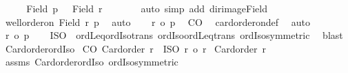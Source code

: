 \begin{isabellebody}
\ \ \isamarkupfalse%
\ \isamarkupfalse%
\ {\isachardoublequoteopen}Field\ {\isacharquery}{\kern0pt}p\ {\isacharequal}{\kern0pt}\ \ Field\ r{\isachardoublequoteclose}\isanewline
\ \ \isamarkupfalse%
\ {}\ {}\ \isamarkupfalse%
\ {\isacharparenleft}{\kern0pt}auto\ simp\ add{\isacharcolon}{\kern0pt}\ dir{\isacharunderscore}{\kern0pt}image{\isacharunderscore}{\kern0pt}Field{\isacharparenright}{\kern0pt}\isanewline
\ \ \isamarkupfalse%
\ \isamarkupfalse%
\ {\isachardoublequoteopen}well{\isacharunderscore}{\kern0pt}order{\isacharunderscore}{\kern0pt}on\ {\isacharparenleft}{\kern0pt}Field\ r{\isacharparenright}{\kern0pt}\ {\isacharquery}{\kern0pt}p{\isachardoublequoteclose}\ \isamarkupfalse%
\ auto\isanewline
\ \ \isamarkupfalse%
\ {\isachardoublequoteopen}r\ {\isasymle}o\ {\isacharquery}{\kern0pt}p{\isachardoublequoteclose}\ \isamarkupfalse%
\ CO\ \isamarkupfalse%
\ card{\isacharunderscore}{\kern0pt}order{\isacharunderscore}{\kern0pt}on{\isacharunderscore}{\kern0pt}def\ \isamarkupfalse%
\ auto\isanewline
\ \ \isamarkupfalse%
\ {\isachardoublequoteopen}r{\isacharprime}{\kern0pt}\ {\isasymle}o\ p{\isacharprime}{\kern0pt}{\isachardoublequoteclose}\isanewline
\ \ \isamarkupfalse%
\ ISO\ {}\ ordLeq{\isacharunderscore}{\kern0pt}ordIso{\isacharunderscore}{\kern0pt}trans\ ordIso{\isacharunderscore}{\kern0pt}ordLeq{\isacharunderscore}{\kern0pt}trans\ ordIso{\isacharunderscore}{\kern0pt}symmetric\ \isamarkupfalse%
\ blast\isanewline
{}\isamarkupfalse%
%
\endisatagproof
{\isafoldproof}%
%
\isadelimproof
\isanewline
%
\endisadelimproof
\isanewline
{}\isamarkupfalse%
\ Card{\isacharunderscore}{\kern0pt}order{\isacharunderscore}{\kern0pt}ordIso{}{\isacharcolon}{\kern0pt}\isanewline
{}\ CO{\isacharcolon}{\kern0pt}\ {\isachardoublequoteopen}Card{\isacharunderscore}{\kern0pt}order\ r{\isachardoublequoteclose}\ \ ISO{\isacharcolon}{\kern0pt}\ {\isachardoublequoteopen}r\ {\isacharequal}{\kern0pt}o\ r{\isacharprime}{\kern0pt}{\isachardoublequoteclose}\isanewline
{}\ {\isachardoublequoteopen}Card{\isacharunderscore}{\kern0pt}order\ r{\isacharprime}{\kern0pt}{\isachardoublequoteclose}\isanewline
%
\isadelimproof
%
\endisadelimproof
%
\isatagproof
{}\isamarkupfalse%
\ assms\ Card{\isacharunderscore}{\kern0pt}order{\isacharunderscore}{\kern0pt}ordIso\ ordIso{\isacharunderscore}{\kern0pt}symmetric\ \isamarkupfalse%

\end{isabellebody}

